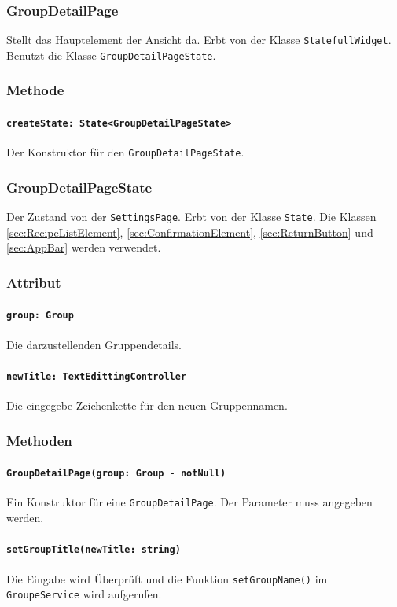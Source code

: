 \documentclass{entwurfsheft}
\begin{document}
    \subsubsection{GroupDetailPage}
        Stellt das Hauptelement der Ansicht da. Erbt von der Klasse \texttt{StatefullWidget}. Benutzt die Klasse \texttt{GroupDetailPageState}.
        \subsubsection*{Methode}
            \paragraph*{\texttt{createState: State<GroupDetailPageState>}} Der Konstruktor für den \texttt{GroupDetailPageState}.

    \subsubsection{GroupDetailPageState}
        Der Zustand von der \texttt{SettingsPage}. Erbt von der Klasse \texttt{State}. Die Klassen \ref{sec:RecipeListElement}, \ref{sec:ConfirmationElement}, \ref{sec:ReturnButton} und \ref{sec:AppBar} werden verwendet.
        \subsubsection*{Attribut}
            \paragraph*{\texttt{group: Group}} Die darzustellenden Gruppendetails.
            \paragraph*{\texttt{newTitle: TextEdittingController}} Die eingegebe Zeichenkette für den neuen Gruppennamen.

        \subsubsection*{Methoden}
            \paragraph*{\texttt{GroupDetailPage(group: Group - notNull)}} Ein Konstruktor für eine \texttt{GroupDetailPage}. Der Parameter muss angegeben werden. 
            \paragraph*{\texttt{setGroupTitle(newTitle: string)}} Die Eingabe wird Überprüft und die Funktion \texttt{setGroupName()} im \texttt{GroupeService} wird aufgerufen.
\end{document}
